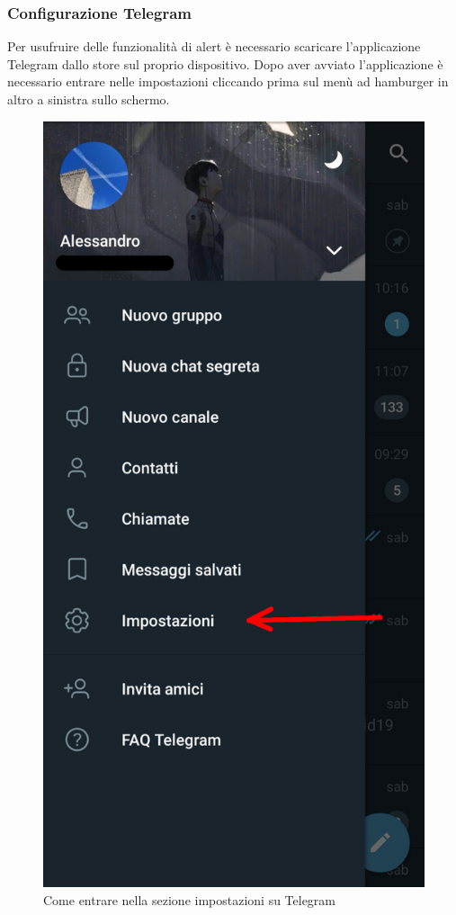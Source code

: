 	\subsubsection{Configurazione Telegram}
		Per usufruire delle funzionalità di alert è necessario scaricare l'applicazione Telegram dallo store sul proprio dispositivo.
		Dopo aver avviato l'applicazione è necessario entrare nelle impostazioni cliccando prima sul menù ad hamburger in altro a sinistra sullo schermo.
		\begin{figure}[H]
			\centering
			\includegraphics[scale=0.150]{res/images/telegram1.jpg}
			\caption{Come entrare nella sezione impostazioni su Telegram}
			\label{Screenshot1}
		\end{figure}

